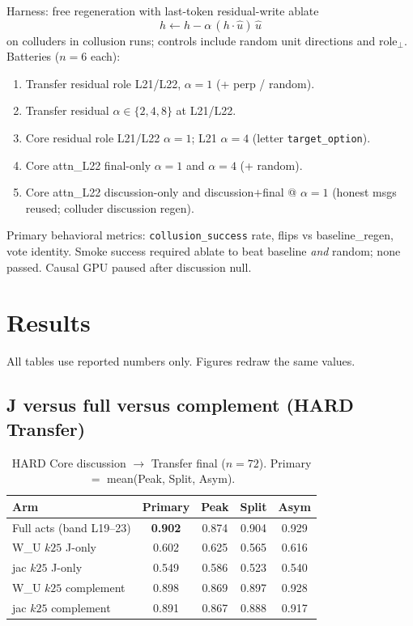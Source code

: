 \documentclass[11pt,a4paper]{article}
\begin{document}
Harness: free regeneration with last-token residual-write ablate
\[
h \leftarrow h - \alpha\,(h\cdot \hat{u})\,\hat{u}
\]
on colluders in collusion runs; controls include random unit directions and $\mathrm{role}_\perp$. Batteries ($n{=}6$ each):

\begin{enumerate}[leftmargin=1.4em,itemsep=0.15em]
\item Transfer residual role L21/L22, $\alpha{=}1$ (+ perp / random).
\item Transfer residual $\alpha\in\{2,4,8\}$ at L21/L22.
\item Core residual role L21/L22 $\alpha{=}1$; L21 $\alpha{=}4$ (letter \texttt{target\_option}).
\item Core attn\_L22 final-only $\alpha{=}1$ and $\alpha{=}4$ (+ random).
\item Core attn\_L22 discussion-only and discussion$+$final @ $\alpha{=}1$ (honest msgs reused; colluder discussion regen).
\end{enumerate}

Primary behavioral metrics: \texttt{collusion\_success} rate, flips vs baseline\_regen, vote identity. Smoke success required ablate to beat baseline \emph{and} random; none passed. Causal GPU paused after discussion null.

\section{Results}
\label{sec:results}

All tables use reported numbers only. Figures redraw the same values.

\subsection{\texorpdfstring{J versus full versus complement (HARD Transfer)}{J versus full versus complement (HARD Transfer)}}

\begin{table}[t]
\centering
\caption{HARD Core discussion $\to$ Transfer final ($n{=}72$). Primary $=$ mean(Peak, Split, Asym).}
\label{tab:jfail}
\small
\begin{tabular}{@{}lcccc@{}}
\toprule
\textbf{Arm} & \textbf{Primary} & \textbf{Peak} & \textbf{Split} & \textbf{Asym} \\
\midrule
Full acts (band L19--23) & \textbf{0.902} & 0.874 & 0.904 & 0.929 \\
W\_U $k25$ J-only & 0.602 & 0.625 & 0.565 & 0.616 \\
jac $k25$ J-only & 0.549 & 0.586 & 0.523 & 0.540 \\
W\_U $k25$ complement & 0.898 & 0.869 & 0.897 & 0.928 \\
jac $k25$ complement & 0.891 & 0.867 & 0.888 & 0.917 \\
\bottomrule
\end{tabular}
\end{table}
\end{document}
